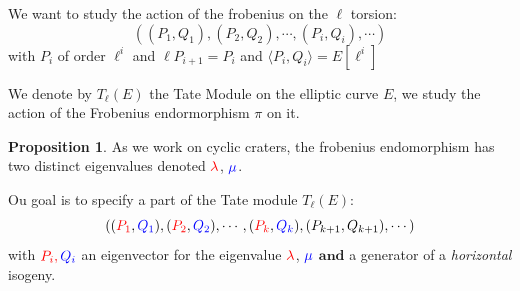 \documentclass[10pt,a4paper]{beamer}
\theoremstyle{plain}
\theoremstyle{definition}
\theoremstyle{definition}
\theoremstyle{definition}
\newtheorem{prop}[thm]{Proposition}
\theoremstyle{definition}
\theoremstyle{remark}
\newtheorem{rem}[thm]{Remark}
\theoremstyle{remark}
\begin{document}
\begin{frame}
We want to study the action of the frobenius on the $\ell$ torsion:
\[
((P_1,Q_1),(P_2,Q_2),\cdots ,(P_i,Q_i),\cdots)
\]
with $P_i$ of order $\ell^i$ and $\ell P_{i+1}=P_i$ and $\langle P_i,Q_i \rangle = E[\ell^i]$

We denote by $T_{\ell}(E)$ the Tate Module on the elliptic curve $E$, we study the action of the Frobenius endormorphism $\pi$ on it.

\begin{prop}
As we work on cyclic craters, the frobenius endomorphism has two distinct eigenvalues denoted $\color{red}{\lambda}$, $\color{blue}{\mu}$.
\end{prop}
\pause
Ou goal is to specify a part of the Tate module $T_{\ell}(E)$:
\[
((\color{red}{P_1}\color{black},\color{blue}{Q_1}\color{black}),(\color{red}{P_2}\color{black},\color{blue}{Q_2}\color{black}),\cdots ,(\color{red}{P_k}\color{black},\color{blue}{Q_k}\color{black}),(P_{k+1},Q_{k+1}),\cdots)
\]
with $\color{red}{P_i}, \color{blue}{Q_i}$ an eigenvector for the eigenvalue $\color{red}{ \lambda}$, $\color{blue}{ \mu}$ $\textbf{and}$ a generator of a \emph{horizontal} isogeny.
%


\end{frame}
\end{document}

